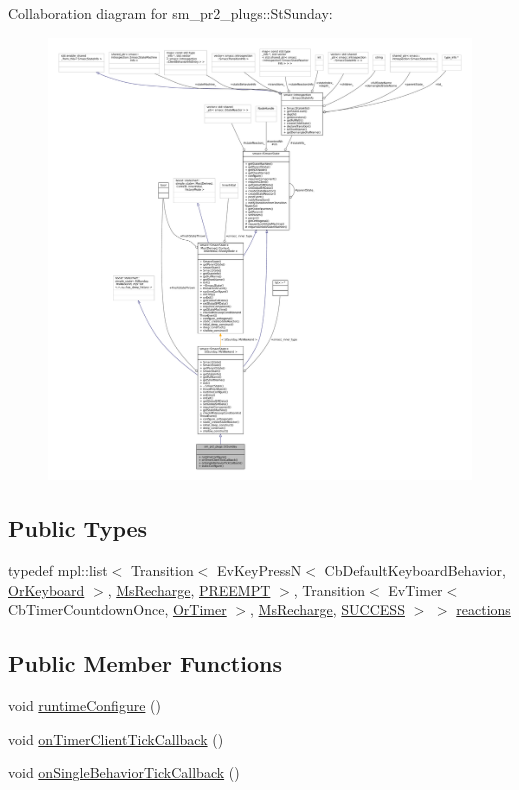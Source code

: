 Collaboration diagram for sm\+\_\+pr2\+\_\+plugs\+:\+:St\+Sunday\+:
\nopagebreak
\begin{figure}[H]
\begin{center}
\leavevmode
\includegraphics[width=350pt]{structsm__pr2__plugs_1_1StSunday__coll__graph}
\end{center}
\end{figure}
\subsection*{Public Types}
\begin{DoxyCompactItemize}
\item 
typedef mpl\+::list$<$ Transition$<$ Ev\+Key\+PressN$<$ Cb\+Default\+Keyboard\+Behavior, \hyperlink{classsm__pr2__plugs_1_1OrKeyboard}{Or\+Keyboard} $>$, \hyperlink{classsm__pr2__plugs_1_1MsRecharge}{Ms\+Recharge}, \hyperlink{classPREEMPT}{P\+R\+E\+E\+M\+PT} $>$, Transition$<$ Ev\+Timer$<$ Cb\+Timer\+Countdown\+Once, \hyperlink{classsm__pr2__plugs_1_1OrTimer}{Or\+Timer} $>$, \hyperlink{classsm__pr2__plugs_1_1MsRecharge}{Ms\+Recharge}, \hyperlink{classSUCCESS}{S\+U\+C\+C\+E\+SS} $>$ $>$ \hyperlink{structsm__pr2__plugs_1_1StSunday_ad110ae99c0cba95e61fef65e59453894}{reactions}
\end{DoxyCompactItemize}
\subsection*{Public Member Functions}
\begin{DoxyCompactItemize}
\item 
void \hyperlink{structsm__pr2__plugs_1_1StSunday_a184a3541f7e54fe67c17d078ef20dcde}{runtime\+Configure} ()
\item 
void \hyperlink{structsm__pr2__plugs_1_1StSunday_a8edc04f7306696db9c7a9972aaa5a2e0}{on\+Timer\+Client\+Tick\+Callback} ()
\item 
void \hyperlink{structsm__pr2__plugs_1_1StSunday_a2505ae6019aced0b23ba628e2be8b13a}{on\+Single\+Behavior\+Tick\+Callback} ()
\end{DoxyCompactItemize}
